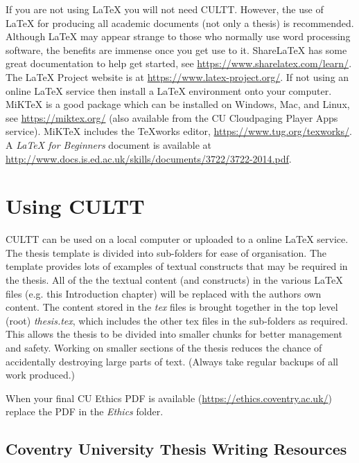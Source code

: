 If you are not using \LaTeX{} you will not need CULTT. However, the use of \LaTeX{} for producing all academic documents (not only a thesis) is recommended. Although \LaTeX{} may appear strange to those who normally use word processing software, the benefits are immense once you get use to it. ShareLaTeX has some great documentation to help get started, see \url{https://www.sharelatex.com/learn/}. The \LaTeX{} Project website is at \url{https://www.latex-project.org/}. If not using an online \LaTeX{} service then install a \LaTeX{} environment onto your computer. MiKTeX is a good package which can be installed on Windows, Mac, and Linux, see \url{https://miktex.org/} (also available from the CU Cloudpaging Player Apps service). MiKTeX includes the TeXworks editor, \url{https://www.tug.org/texworks/}. A \emph{\LaTeX{} for Beginners} document is available at \url{http://www.docs.is.ed.ac.uk/skills/documents/3722/3722-2014.pdf}.

\section{Using CULTT} %

CULTT can be used on a local computer or uploaded to a online \LaTeX{} service. The thesis template is divided into sub-folders for ease of organisation. The template provides lots of examples of textual constructs that may be required in the thesis. All of the the textual content (and constructs) in the various \LaTeX{} files (e.g. this Introduction chapter) will be replaced with the authors own content. The content stored in the \emph{tex} files is brought together in the top level (root) \emph{thesis.tex}, which includes the other tex files in the sub-folders as required. This allows the thesis to be divided into smaller chunks for better management and safety. Working on smaller sections of the thesis reduces the chance of accidentally destroying large parts of text. (Always take regular backups of all work produced.)

When your final CU Ethics PDF is available (\url{https://ethics.coventry.ac.uk/}) replace the PDF in the \emph{Ethics} folder.

\subsection{Coventry University Thesis Writing Resources}

